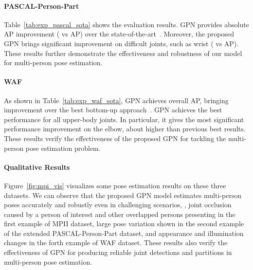 \documentclass[10pt,twocolumn,letterpaper]{article}
\begin{document}
\vspace{-4mm}
\paragraph{PASCAL-Person-Part} Table~\ref{tab:exp_pascal_sota} shows the evaluation results. GPN provides absolute  AP improvement ( vs  AP) over the state-of-the-art~\cite{xia2017joint}. Moreover, the proposed GPN brings significant improvement on difficult joints, such as wrist  ( vs  AP). These results further demonstrate the effectiveness and robustness of our model for multi-person pose estimation.

\vspace{-4mm}
\paragraph{WAF} As shown in Table~\ref{tab:exp_waf_sota}, GPN  achieves overall  AP, bringing   improvement over the best bottom-up approach~\cite{hpe:deepercut_eccv16}. GPN achieves the best performance for all upper-body joints. In particular, it gives the most significant performance  improvement on the elbow, about  higher than previous best results. These results  verify the effectiveness of the proposed GPN for tackling the multi-person pose estimation problem.



\vspace{-4mm}
\paragraph{Qualitative Results} Figure~\ref{fig:mpi_vis} visualizes some pose estimation results on these three datasets. We can observe that the proposed GPN model estimates multi-person poses accurately and robustly even in challenging scenarios, \eg, joint occlusion caused by a person of interest and other overlapped persons presenting in the first example of MPII dataset, large pose variation shown in the second example of the extended PASCAL-Person-Part dataset, and appearance and illumination changes in the forth example of WAF dataset. These results also verify the effectiveness of GPN for producing reliable joint detections and partitions in multi-person pose estimation. 
\end{document}
